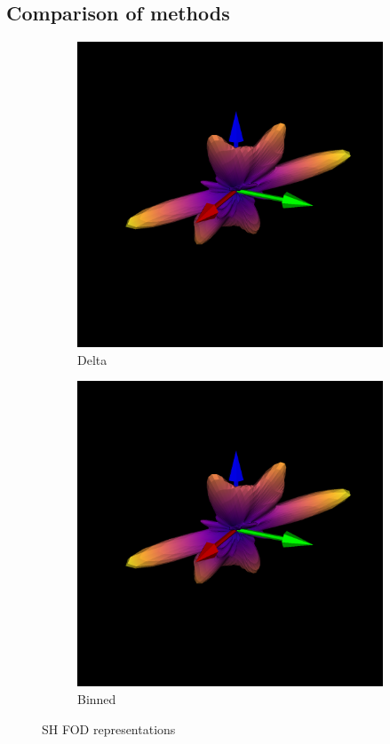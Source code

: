 \documentclass{article}
\begin{document}
\subsection{Comparison of methods}
\begin{figure}[h]
  \centering
  \begin{subfigure}[b]{0.48\textwidth}
    \centering
    \includegraphics[width=0.9\linewidth]{../odf_comparison/delta_odf_sh}
    \caption{Delta}
    \label{fig:delta}
  \end{subfigure}
  \hspace{0.5em}
  \begin{subfigure}[b]{0.48\textwidth}
    \centering
    \includegraphics[width=0.9\linewidth]{../odf_comparison/hist_odf_sh}
    \caption{Binned}
    \label{fig:binned}
  \end{subfigure}
  \caption{SH FOD representations}
  \label{fig:vis_comparison}
\end{figure}
\end{document}
